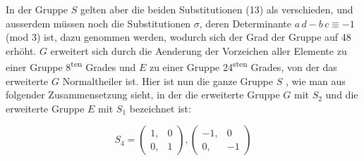 In der Gruppe $S$ gelten aber die beiden Substitutionen (13)
als verschieden, und ausserdem m\"ussen noch die Substitutionen
$\sigma$, deren Determinante $a\,d - b\,c \equiv -1$ (mod 3) ist, dazu
genommen werden, wodurch sich der Grad der Gruppe auf 48
erh\"oht. $G$ erweitert sich durch die Aenderung der Vorzeichen
aller Elemente zu einer Gruppe 8\textsuperscript{ten} Grades und $E$ zu einer
Gruppe 24\textsuperscript{sten} Grades, von der das erweiterte $G$ Normaltheiler
ist. Hier ist nun die ganze Gruppe $S$ , wie man
aus folgender Zusammensetzung sieht, in der die erweiterte
Gruppe $G$ mit $S_2$ und die erweiterte Gruppe $E$ mit $S_1$ bezeichnet
 ist:

\[ S_4 = \begin{pmatrix} 1, & 0 \\ 0, & 1 \end{pmatrix}, \begin{pmatrix} -1, & 0 \\ 0, & -1 \end{pmatrix} \]
